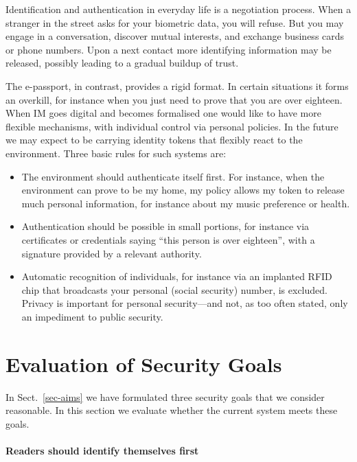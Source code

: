 \documentclass[runningheads,envcountsame,envcountsect,oribibl]{llncs}
\begin{document}
Identification and authentication in everyday life is a negotiation
process. When a stranger in the street asks for your biometric data, you
will refuse. But you may engage in a conversation, discover mutual
interests, and exchange business cards or phone numbers. Upon a next
contact more identifying information may be released, possibly leading
to a gradual buildup of trust.

The e-passport, in contrast, provides a rigid format. In certain
situations it forms an overkill, for instance when you just need to
prove that you are over eighteen. When IM goes digital and becomes
formalised one would like to have more flexible mechanisms, with
individual control via personal policies. In the future we may
expect to be carrying identity tokens that flexibly react to the
environment. Three basic rules for such systems are:
\begin{itemize}
\item The environment should authenticate itself first. For instance,
when the environment can prove to be my home, my policy allows my
token to release much personal information, for instance about my
music preference or health.

\item Authentication should be possible in small portions, for instance
via certificates or credentials saying ``this person is over
eighteen'', with a signature provided by a relevant authority.

\item Automatic recognition of individuals, for instance
via an implanted RFID chip that broadcasts your personal (social
security) number, is excluded.  
Privacy is important
for personal security---and not, as too often stated, only an
impediment to public security.
\end{itemize}

\section{Evaluation of Security Goals}
\label{sec-eval}

In Sect.~\ref{sec-aims} we have formulated three security goals that we
consider reasonable. In this section we evaluate whether the current system
meets these goals.

\paragraph{Readers should identify themselves first}
\end{document}
